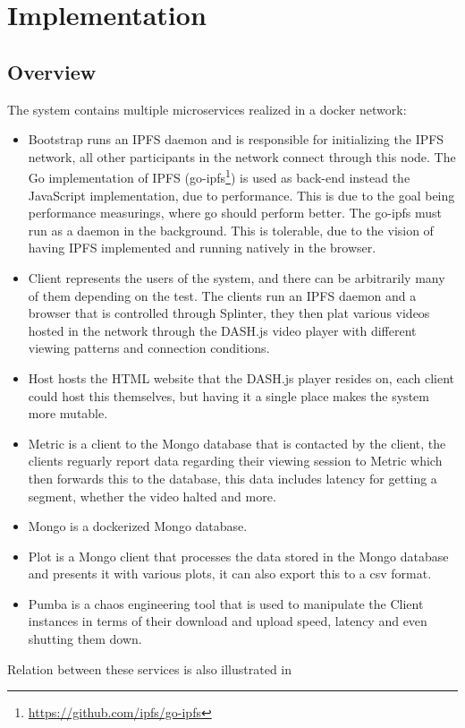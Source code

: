 \chapter{Implementation}
\label{cha:implementation}
\section{Overview}
The system  contains multiple microservices realized in a docker network:
\begin{itemize}
    \item Bootstrap runs an IPFS daemon and is responsible for initializing the IPFS network, all other participants in the network connect through this node. 
    The Go implementation of \acs{IPFS} (go-ipfs\footnote{\url{https://github.com/ipfs/go-ipfs}}) is used as back-end instead the JavaScript implementation, due to performance. This is due to the goal being performance measurings, where go should perform better. The go-ipfs must run as a daemon in the background. This is tolerable, due to the vision of having IPFS implemented and running natively in the browser.
    \item Client represents the users of the system, and there can be arbitrarily many of them depending on the test. The clients run an IPFS daemon and a browser that is controlled through Splinter, they then plat various videos hosted in the network through the DASH.js video player with different viewing patterns and connection conditions.
    \item Host hosts the HTML website that the DASH.js player resides on, each client could host this themselves, but having it a single place makes the system more mutable.
    \item Metric is a client to the Mongo database that is contacted by the client, the clients reguarly report data regarding their viewing session to Metric which then forwards this to the database, this data includes latency for getting a segment, whether the video halted and more.
    \item Mongo is a dockerized Mongo database.
    \item Plot is a Mongo client that processes the data stored in the Mongo database and presents it with various plots, it can also export this to a csv format.
    \item Pumba is a chaos engineering tool that is used to manipulate the Client instances in terms of their download and upload speed, latency and even shutting them down.
\end{itemize}
Relation between these services is also  illustrated in %


